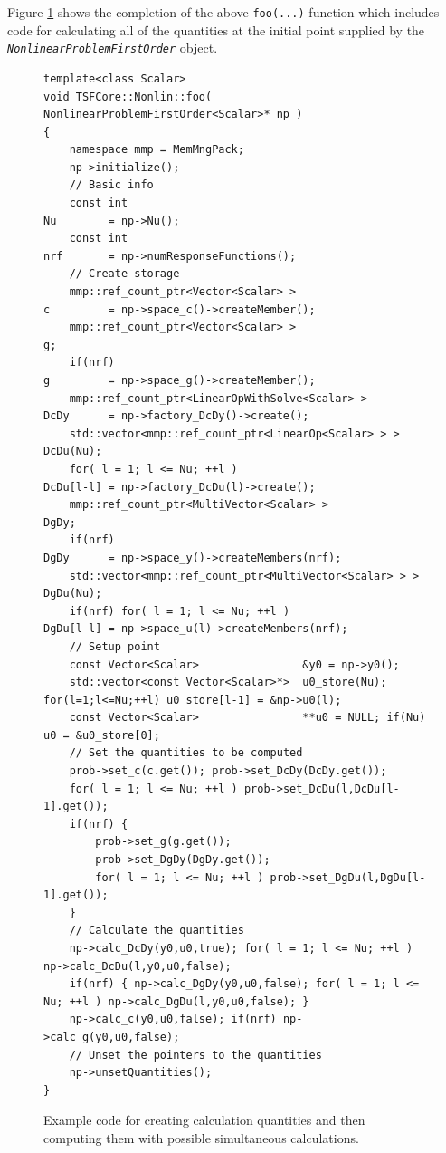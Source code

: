 Figure \ref{tsfcore:nonlin:fig:foo} shows the completion of the above
\texttt{foo(...)} function which includes code for calculating all of the
quantities at the initial point supplied by the
\texttt{\textit{Nonlinear\-Problem\-First\-Order}} object.
%
{\bsinglespace
\begin{figure}
\begin{minipage}{\textwidth}
{\scriptsize\begin{verbatim}
template<class Scalar>
void TSFCore::Nonlin::foo( NonlinearProblemFirstOrder<Scalar>* np )
{
    namespace mmp = MemMngPack;
    np->initialize();
    // Basic info
    const int                                               Nu        = np->Nu();
    const int                                               nrf       = np->numResponseFunctions();
    // Create storage
    mmp::ref_count_ptr<Vector<Scalar> >                     c         = np->space_c()->createMember();
    mmp::ref_count_ptr<Vector<Scalar> >                     g;
    if(nrf)                                                 g         = np->space_g()->createMember();
    mmp::ref_count_ptr<LinearOpWithSolve<Scalar> >          DcDy      = np->factory_DcDy()->create();
    std::vector<mmp::ref_count_ptr<LinearOp<Scalar> > >     DcDu(Nu);
    for( l = 1; l <= Nu; ++l )                              DcDu[l-l] = np->factory_DcDu(l)->create();
    mmp::ref_count_ptr<MultiVector<Scalar> >                DgDy;
    if(nrf)                                                 DgDy      = np->space_y()->createMembers(nrf);
    std::vector<mmp::ref_count_ptr<MultiVector<Scalar> > >  DgDu(Nu);
    if(nrf) for( l = 1; l <= Nu; ++l )                      DgDu[l-l] = np->space_u(l)->createMembers(nrf);
    // Setup point
    const Vector<Scalar>                &y0 = np->y0();
    std::vector<const Vector<Scalar>*>  u0_store(Nu); for(l=1;l<=Nu;++l) u0_store[l-1] = &np->u0(l);
    const Vector<Scalar>                **u0 = NULL; if(Nu) u0 = &u0_store[0];
    // Set the quantities to be computed
    prob->set_c(c.get()); prob->set_DcDy(DcDy.get());
    for( l = 1; l <= Nu; ++l ) prob->set_DcDu(l,DcDu[l-1].get());
    if(nrf) {
        prob->set_g(g.get());
        prob->set_DgDy(DgDy.get());
        for( l = 1; l <= Nu; ++l ) prob->set_DgDu(l,DgDu[l-1].get());
    }
    // Calculate the quantities
    np->calc_DcDy(y0,u0,true); for( l = 1; l <= Nu; ++l ) np->calc_DcDu(l,y0,u0,false);
    if(nrf) { np->calc_DgDy(y0,u0,false); for( l = 1; l <= Nu; ++l ) np->calc_DgDu(l,y0,u0,false); }
    np->calc_c(y0,u0,false); if(nrf) np->calc_g(y0,u0,false);
    // Unset the pointers to the quantities
    np->unsetQuantities();
}
\end{verbatim}}
\end{minipage}
\caption{
\label{tsfcore:nonlin:fig:foo}
Example code for creating calculation quantities and then computing
them with possible simultaneous calculations.
}
\end{figure}
\esinglespace}
